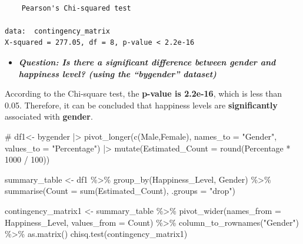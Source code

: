 \documentclass[
  11pt,
  a4paper,
  DIV=11,
  numbers=noendperiod]{scrartcl}
\newenvironment{Shaded}{\begin{snugshade}}{\end{snugshade}}
\newcommand{\AttributeTok}[1]{\textcolor[rgb]{0.40,0.45,0.13}{#1}}
\newcommand{\CommentTok}[1]{\textcolor[rgb]{0.37,0.37,0.37}{#1}}
\newcommand{\DecValTok}[1]{\textcolor[rgb]{0.68,0.00,0.00}{#1}}
\newcommand{\FunctionTok}[1]{\textcolor[rgb]{0.28,0.35,0.67}{#1}}
\newcommand{\NormalTok}[1]{\textcolor[rgb]{0.00,0.23,0.31}{#1}}
\newcommand{\OtherTok}[1]{\textcolor[rgb]{0.00,0.23,0.31}{#1}}
\newcommand{\SpecialCharTok}[1]{\textcolor[rgb]{0.37,0.37,0.37}{#1}}
\newcommand{\StringTok}[1]{\textcolor[rgb]{0.13,0.47,0.30}{#1}}
\providecommand{\tightlist}{%
  \setlength{\itemsep}{0pt}\setlength{\parskip}{0pt}}\usepackage{longtable,booktabs,array}
\begin{document}
\begin{verbatim}

    Pearson's Chi-squared test

data:  contingency_matrix
X-squared = 277.05, df = 8, p-value < 2.2e-16
\end{verbatim}

\begin{itemize}
\tightlist
\item
  {\textbf{\emph{Question: Is there a significant difference between
  gender and happiness level? (using the ``bygender'' dataset)}}}
\end{itemize}

According to the Chi-square test, the {\textbf{p-value is 2.2e-16}},
which is less than 0.05. Therefore, it can be concluded that happiness
levels are {\textbf{significantly}} associated with {\textbf{gender}}.

\begin{Shaded}
\begin{Highlighting}[]
\CommentTok{\#}
\NormalTok{df1}\OtherTok{\textless{}{-}}\NormalTok{ bygender }\SpecialCharTok{|\textgreater{}} \FunctionTok{pivot\_longer}\NormalTok{(}\FunctionTok{c}\NormalTok{(Male,Female),}
               \AttributeTok{names\_to  =} \StringTok{"Gender"}\NormalTok{,}
               \AttributeTok{values\_to =} \StringTok{"Percentage"}\NormalTok{) }\SpecialCharTok{|\textgreater{}}
 \FunctionTok{mutate}\NormalTok{(}\AttributeTok{Estimated\_Count =} \FunctionTok{round}\NormalTok{(Percentage }\SpecialCharTok{*} \DecValTok{1000} \SpecialCharTok{/} \DecValTok{100}\NormalTok{))}
 

\NormalTok{summary\_table }\OtherTok{\textless{}{-}}\NormalTok{ df1 }\SpecialCharTok{\%\textgreater{}\%}
  \FunctionTok{group\_by}\NormalTok{(Happiness\_Level, Gender) }\SpecialCharTok{\%\textgreater{}\%}
  \FunctionTok{summarise}\NormalTok{(}\AttributeTok{Count =} \FunctionTok{sum}\NormalTok{(Estimated\_Count), }\AttributeTok{.groups =} \StringTok{"drop"}\NormalTok{)}

\NormalTok{contingency\_matrix1 }\OtherTok{\textless{}{-}}\NormalTok{ summary\_table }\SpecialCharTok{\%\textgreater{}\%}
  \FunctionTok{pivot\_wider}\NormalTok{(}\AttributeTok{names\_from =}\NormalTok{ Happiness\_Level, }\AttributeTok{values\_from =}\NormalTok{ Count) }\SpecialCharTok{\%\textgreater{}\%}
  \FunctionTok{column\_to\_rownames}\NormalTok{(}\StringTok{"Gender"}\NormalTok{) }\SpecialCharTok{\%\textgreater{}\%}
  \FunctionTok{as.matrix}\NormalTok{()}
\FunctionTok{chisq.test}\NormalTok{(contingency\_matrix1)}
\end{Highlighting}
\end{Shaded}
\end{document}
